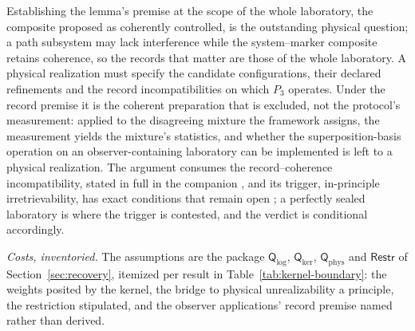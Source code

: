 \noindent Establishing the lemma's premise at the scope of the whole laboratory, the composite proposed as coherently controlled, is the outstanding physical question; a path subsystem may lack interference while the system--marker composite retains coherence, so the records that matter are those of the whole laboratory. A physical realization must specify the candidate configurations, their declared refinements and the record incompatibilities on which $P_3$ operates. Under the record premise it is the coherent preparation that is excluded, not the protocol's measurement: applied to the disagreeing mixture the framework assigns, the measurement yields the mixture's statistics, and whether the superposition-basis operation on an observer-containing laboratory can be implemented is left to a physical realization. The argument consumes the record--coherence incompatibility, stated in full in the companion \cite{Aethus}, and its trigger, in-principle irretrievability, has exact conditions that remain open \cite{AethusBrief}; a perfectly sealed laboratory is where the trigger is contested, and the verdict is conditional accordingly.

\emph{Costs, inventoried.} The assumptions are the package $\mathsf{Q}_{\log}$, $\mathsf{Q}_{\mathrm{ker}}$, $\mathsf{Q}_{\mathrm{phys}}$ and $\mathsf{Restr}$ of Section~\ref{sec:recovery}, itemized per result in Table~\ref{tab:kernel-boundary}: the weights posited by the kernel, the bridge to physical unrealizability a principle, the restriction stipulated, and the observer applications' record premise named rather than derived.

